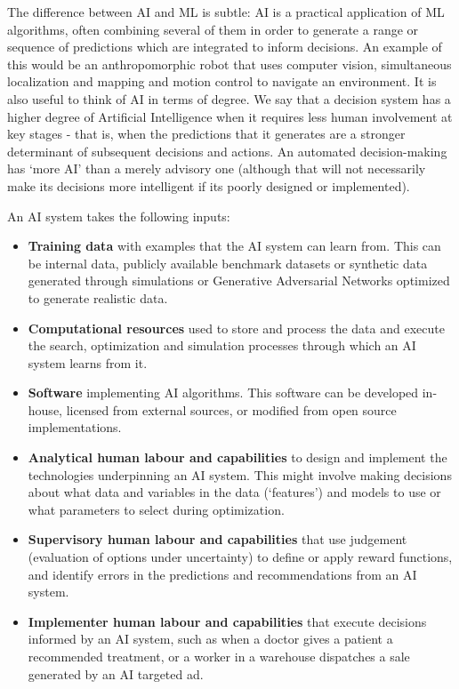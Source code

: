 \documentclass[11pt]{article}
\begin{document}
The difference between AI and ML is subtle: AI is a practical application of ML algorithms, often combining several of them in order to generate a range or sequence of predictions which are integrated to inform decisions. An example of this would be an anthropomorphic robot that uses computer vision, simultaneous localization and mapping and motion control to navigate an environment. It is also useful to think of AI in terms of degree. We say that a decision system has a higher degree of Artificial Intelligence when it requires less human involvement at key stages - that is, when the predictions that it generates are a stronger determinant of subsequent decisions and actions. An automated decision-making has `more AI' than a merely advisory one (although that will not necessarily make its decisions more intelligent if its poorly designed or implemented).

An AI system takes the following inputs: 

\begin{itemize}
    \item \textbf{Training data} with examples that the AI system can learn from. This can be internal data, publicly available benchmark datasets or synthetic data generated through simulations or Generative Adversarial Networks optimized to generate realistic data.
    \item \textbf{Computational resources} used to store and process the data and execute the search, optimization and simulation processes through which an AI system learns from it.
    \item \textbf{Software} implementing AI algorithms. This software can be developed in-house, licensed from external sources, or modified from open source implementations. 
    \item \textbf{Analytical human labour and capabilities} to design and implement the technologies underpinning an AI system. This might involve making decisions about what data and variables in the data (`features') and models to use or what parameters to select during optimization.
    \item \textbf{Supervisory human labour and capabilities} that use judgement (evaluation of options under uncertainty) to define or apply reward functions, and identify errors in the predictions and recommendations from an AI system.
    \item \textbf{Implementer human labour and capabilities} that execute decisions informed by an AI system, such as when a doctor gives a patient a recommended treatment, or a worker in a warehouse dispatches a sale generated by an AI targeted ad.
\end{itemize}
\end{document}

